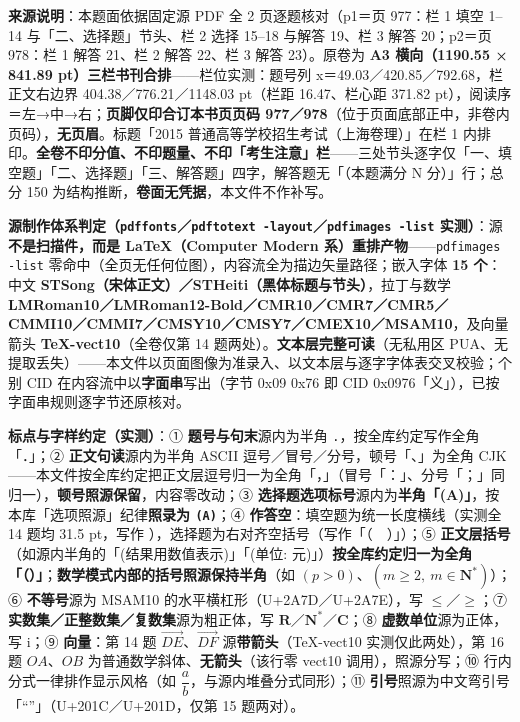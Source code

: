 


\begin{gktip}
\textbf{来源说明}：本题面依据固定源 PDF 全 2 页逐题核对（p1＝页 977：栏 1 填空 1–14 与「二、选择题」节头、栏 2 选择 15–18 与解答 19、栏 3 解答 20；p2＝页 978：栏 1 解答 21、栏 2 解答 22、栏 3 解答 23）。原卷为 \textbf{A3 横向（1190.55 × 841.89 pt）三栏书刊合排}——栏位实测：题号列 x＝49.03／420.85／792.68，栏正文右边界 404.38／776.21／1148.03 pt（栏距 16.47、栏心距 371.82 pt），阅读序＝左→中→右；\textbf{页脚仅印合订本书页页码 977／978}（位于页面底部正中，非卷内页码），\textbf{无页眉}。标题「2015 普通高等学校招生考试（上海卷理）」在栏 1 内排印。\textbf{全卷不印分值、不印题量、不印「考生注意」栏}——三处节头逐字仅「一、填空题」「二、选择题」「三、解答题」四字，解答题无「（本题满分 N 分）」行；总分 150 为结构推断，\textbf{卷面无凭据}，本文件不作补写。

\textbf{源制作体系判定（\texttt{pdffonts}／\texttt{pdftotext -layout}／\texttt{pdfimages -list} 实测）}：源\textbf{不是扫描件，而是 LaTeX（Computer Modern 系）重排产物}——\texttt{pdfimages -list} 零命中（全页无任何位图），内容流全为描边矢量路径；嵌入字体 \textbf{15 个}：中文 \textbf{STSong（宋体正文）／STHeiti（黑体标题与节头）}，拉丁与数学 \textbf{LMRoman10／LMRoman12-Bold／CMR10／CMR7／CMR5／CMMI10／CMMI7／CMSY10／CMSY7／CMEX10／MSAM10}，及向量箭头 \textbf{TeX-vect10}（全卷仅第 14 题两处）。\textbf{文本层完整可读}（无私用区 PUA、无提取丢失）——本文件以页面图像为准录入、以文本层与逐字字体表交叉校验；个别 CID 在内容流中以\textbf{字面串}写出（字节 0x09 0x76 即 CID 0x0976「义」），已按字面串规则逐字节还原核对。

\textbf{标点与字样约定（实测）}：① \textbf{题号与句末}源内为半角 \texttt{.}，按全库约定写作全角「．」；② \textbf{正文句读}源内为半角 ASCII 逗号／冒号／分号，顿号「、」为全角 CJK——本文件按全库约定把正文层逗号归一为全角「，」（冒号「：」、分号「；」同归一），\textbf{顿号照源保留}，内容零改动；③ \textbf{选择题选项标号}源内为\textbf{半角「(A)」}，按本库「选项照源」纪律\textbf{照录为 \texttt{(A)}}；④ \textbf{作答空}：填空题为统一长度横线（实测全 14 题均 31.5 pt，写作 \texttt{\gkblank{}}），选择题为右对齐空括号（写作「（　）」）；⑤ \textbf{正文层括号}（如源内半角的「(结果用数值表示)」「(单位: 元)」）\textbf{按全库约定归一为全角「（）」}；\textbf{数学模式内部的括号照源保持半角}（如 \((p>0)\)、\((m\geqslant 2,\ m\in\mathbf{N}^{*})\)）；⑥ \textbf{不等号}源为 MSAM10 的水平横杠形（U+2A7D／U+2A7E），写 \(\leqslant\)／\(\geqslant\)；⑦ \textbf{实数集／正整数集／复数集}源为粗正体，写 \(\mathbf{R}\)／\(\mathbf{N}^{*}\)／\(\mathbf{C}\)；⑧ \textbf{虚数单位}源为正体，写 \(\mathrm{i}\)；⑨ \textbf{向量}：第 14 题 \(\overrightarrow{DE}\)、\(\overrightarrow{DF}\) 源\textbf{带箭头}（TeX-vect10 实测仅此两处），第 16 题 \(OA\)、\(OB\) 为普通数学斜体、\textbf{无箭头}（该行零 vect10 调用），照源分写；⑩ 行内分式一律排作显示风格（如 \(\dfrac{a}{b}\)，与源内堆叠分式同形）；⑪ \textbf{引号}照源为中文弯引号「“”」（U+201C／U+201D，仅第 15 题两对）。


\end{gktip}
